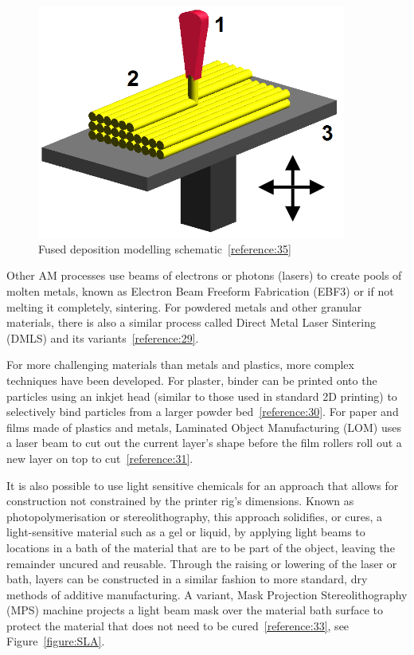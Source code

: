 \documentclass[11pt]{article} %
\begin{document}
\begin{figure}[H]
  \centering
  \includegraphics[width=4in]{FDM_by_Zureks.png}
  \caption{Fused deposition modelling schematic~\ref{reference:35}}
  \label{figure:FDM}
\end{figure}

Other AM processes use beams of electrons or photons (lasers) to create pools of molten metals, known as Electron Beam Freeform Fabrication (EBF3) or if not melting it completely, sintering. For powdered metals and other granular materials, there is also a similar process called Direct Metal Laser Sintering (DMLS) and its variants~\ref{reference:29}.

For more challenging materials than metals and plastics, more complex techniques have been developed. For plaster, binder can be printed onto the particles using an inkjet head (similar to those used in standard 2D printing) to selectively bind particles from a larger powder bed~\ref{reference:30}. For paper and films made of plastics and metals, Laminated Object Manufacturing (LOM) uses a laser beam to cut out the current layer's shape before the film rollers roll out a new layer on top to cut~\ref{reference:31}.

It is also possible to use light sensitive chemicals for an approach that allows for construction not constrained by the printer rig's dimensions. Known as photopolymerisation or stereolithography, this approach solidifies, or cures, a light-sensitive material such as a gel or liquid, by applying light beams to locations in a bath of the material that are to be part of the object, leaving the remainder uncured and reusable. Through the raising or lowering of the laser or bath, layers can be constructed in a similar fashion to more standard, dry methods of additive manufacturing. A variant, Mask Projection Stereolithography (MPS) machine projects a light beam mask over the material bath surface to protect the material that does not need to be cured~\ref{reference:33}, see Figure~\ref{figure:SLA}.
\end{document}
